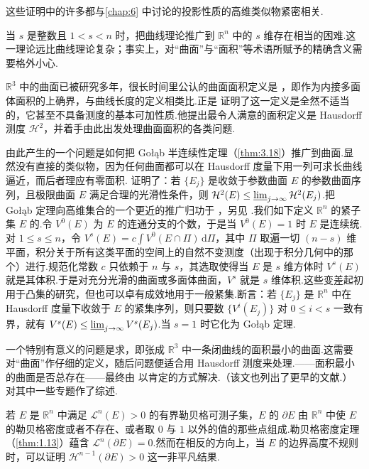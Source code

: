 这些证明中的许多都与\cref{chap:6} 中讨论的投影性质的高维类似物紧密相关.

当 $s$ 是整数且 $1<s<n$ 时，把曲线理论推广到 $\mathbb{R}^n$ 中的 $s$ 维存在相当的困难.这一理论远比曲线理论复杂；事实上，对``曲面''与``面积''等术语所赋予的精确含义需要格外小心.

$\mathbb{R}^3$ 中的曲面已被研究多年，很长时间里公认的曲面面积定义是 ，即作为内接多面体面积的上确界，与曲线长度的定义相类比.正是 \textcite{besicovitch1945b} 证明了这一定义是全然不适当的，它甚至不具备测度的基本可加性质.他提出最令人满意的面积定义是 Hausdorff 测度 $\mathcal{H}^2$，并着手由此出发处理曲面面积的各类问题.

由此产生的一个问题是如何把 Gołąb 半连续性定理（\cref{thm:3.18}）推广到曲面.显然没有直接的类似物，因为任何曲面都可以在 Hausdorff 度量下用一列可求长曲线逼近，而后者理应有零面积.\textcite{besicovitch1949} 证明了：若 $\{E_j\}$ 是收敛于参数曲面 $E$ 的参数曲面序列，且极限曲面 $E$ 满足合理的光滑性条件，则 $\mathcal{H}^2(E)\leq\varliminf_{j\to\infty}\mathcal{H}^2(E_j)$.把 Gołąb 定理向高维集合的一个更近的推广归功于 \textcite{vitushkin1966}，另见 \textcite{ivanov1975}.我们如下定义 $\mathbb{R}^n$ 的紧子集 $E$ 的.令 $V^0(E)$ 为 $E$ 的连通分支的个数，于是当 $V^0(E)=1$ 时 $E$ 是连续统.对 $1\leq s\leq n$，令 $V^s(E)=c\int V^0(E\cap\Pi)\,\mathrm{d}\Pi$，其中 $\Pi$ 取遍一切 $(n-s)$ 维平面，积分关于所有这类平面的空间上的自然不变测度（出现于积分几何中的那个）进行.规范化常数 $c$ 只依赖于 $n$ 与 $s$，其选取使得当 $E$ 是 $s$ 维方体时 $V^s(E)$ 就是其体积.于是对充分光滑的曲面或多面体曲面，$V^s$ 就是 $s$ 维体积.这些变差起初用于凸集的研究，但也可以卓有成效地用于一般紧集.断言：若 $\{E_j\}$ 是 $\mathbb{R}^n$ 中在 Hausdorff 度量下收敛于 $E$ 的紧集序列，则只要数 $\{V^i(E_j)\}$ 对 $0\leq i<s$ 一致有界，就有 $V^s(E)\leq\varliminf_{j\to\infty}V^s(E_j)$.当 $s=1$ 时它化为 Gołąb 定理.

一个特别有意义的问题是求，即张成 $\mathbb{R}^3$ 中一条闭曲线的面积最小的曲面.这需要对``曲面''作仔细的定义，随后问题便适合用 Hausdorff 测度来处理.——面积最小的曲面是否总存在——最终由 \textcite{reifenberg1960} 以肯定的方式解决.（该文也列出了更早的文献.）\textcite{besicovitch1950} 对其中一些专题作了综述.

若 $E$ 是 $\mathbb{R}^n$ 中满足 $\mathcal{L}^n(E)>0$ 的有界勒贝格可测子集，$E$ 的 $\partial E$ 由 $\mathbb{R}^n$ 中使 $E$ 的勒贝格密度或者不存在、或者取 $0$ 与 $1$ 以外的值的那些点组成.勒贝格密度定理（\cref{thm:1.13}）蕴含 $\mathcal{L}^n(\partial E)=0$.然而在相反的方向上，当 $E$ 的边界高度不规则时，可以证明 $\mathcal{H}^{n-1}(\partial E)>0$ 这一非平凡结果.

